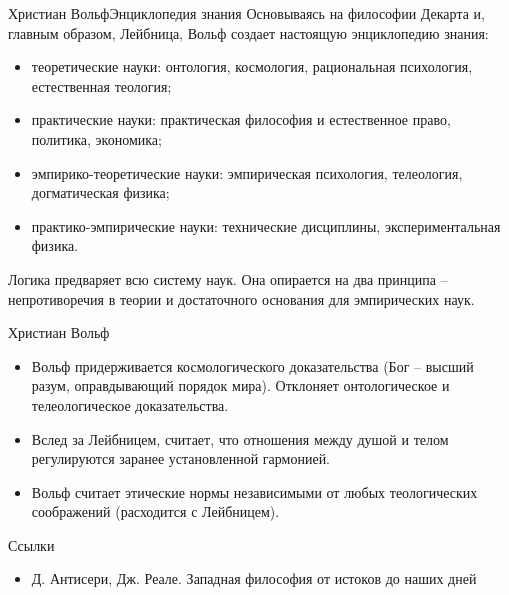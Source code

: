 \documentclass{beamer}
\begin{document}
    \begin{frame}{Христиан Вольф}{Энциклопедия знания}
        Основываясь на философии Декарта и, главным образом, Лейбница,
        Вольф создает настоящую энциклопедию знания:
        \begin{itemize}
        \item теоретические науки: онтология, космология,
            рациональная психология, естественная теология;
        \item практические науки: практическая философия и естественное право,
            политика, экономика;
        \item эмпирико-теоретические науки: эмпирическая психология,
            телеология, догматическая физика;
        \item практико-эмпирические науки: технические дисциплины,
            экспериментальная физика.
        \end{itemize}
        Логика предваряет всю систему наук.
        Она опирается на два принципа -- непротиворечия в теории и
        достаточного основания для эмпирических наук.
    \end{frame}

    \begin{frame}{Христиан Вольф}
        \begin{itemize}
        \item Вольф придерживается космологического доказательства
            (Бог -- высший разум, оправдывающий порядок мира).
            Отклоняет онтологическое и телеологическое доказательства.
        \item Вслед за Лейбницем, считает, что отношения между душой и телом
            регулируются заранее установленной гармонией.
        \item Вольф считает этические нормы независимыми от
            любых теологических соображений (расходится с Лейбницем).
        \end{itemize}
    \end{frame}

    \begin{frame}{Ссылки}
        \begin{itemize}
        \item Д. Антисери, Дж. Реале.
            Западная философия от истоков до наших дней
        \end{itemize}
    \end{frame}
\end{document}
